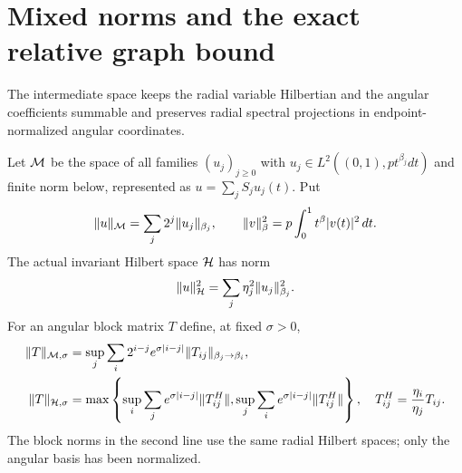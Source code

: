 \section{Mixed norms and the exact relative graph bound}\label{inf:sec-mixed}

The intermediate space keeps the radial variable Hilbertian and the
angular coefficients summable and preserves radial spectral
projections in endpoint-normalized angular coordinates.

\begin{definition}
\label{inf:mixed-spaces}
Let $\mathcal M$ be the space of all families $(u_j)_{j\ge0}$ with
$u_j\in L^2((0,1),pt^{\beta_j}dt)$ and finite norm below,
represented as $u=\sum_jS_ju_j(t)$. Put
\begin{equation}\label{inf:mixed-norm}
 \lVert u\rVert_{\mathcal M}=\sum_j2^j\lVert u_j\rVert_{\beta_j},\qquad
 \lVert v\rVert_\beta^2=p\int_0^1t^\beta|v(t)|^2\,dt.
\end{equation}
The actual invariant Hilbert space $\mathcal{H}$ has norm
\begin{equation}\label{inf:true-H-norm}
 \lVert u\rVert_{\mathcal{H}}^2=\sum_j\eta_j^2\lVert u_j\rVert_{\beta_j}^2.
\end{equation}
For an angular block matrix $T$ define, at fixed $\sigma>0$,
\begin{align}
 \lVert T\rVert_{\mathcal M,\sigma}
 &=\sup_j\sum_i2^{i-j}e^{\sigma|i-j|}
                            \lVert T_{ij}\rVert_{\beta_j\to\beta_i},
 \label{inf:M-matrix-norm}\\
 \lVert T\rVert_{\mathcal{H},\sigma}
 &=\max\left\{
 \sup_i\sum_je^{\sigma|i-j|}\lVert T^H_{ij}\rVert,
 \sup_j\sum_ie^{\sigma|i-j|}\lVert T^H_{ij}\rVert\right\},
 \quad T^H_{ij}=\frac{\eta_i}{\eta_j}T_{ij}.
 \label{inf:H-matrix-norm}
\end{align}
The block norms in the second line use the same radial Hilbert spaces;
only the angular basis has been normalized.
\end{definition}

